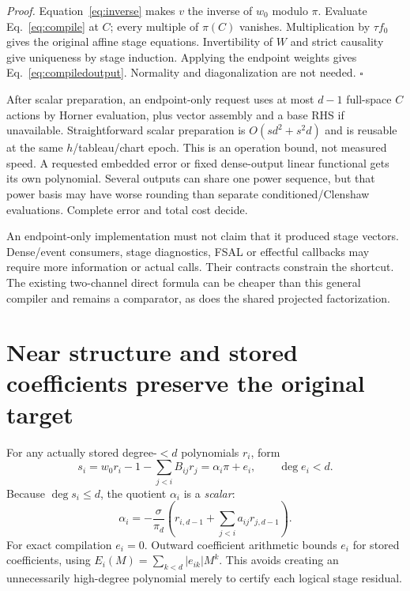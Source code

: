 \documentclass[aps,pra,reprint,onecolumn,10pt,notitlepage,nofootinbib]{revtex4-2}
\begin{document}
\emph{Proof.} Equation~\eqref{eq:inverse} makes $v$ the inverse of $w_0$
modulo $\pi$. Evaluate Eq.~\eqref{eq:compile} at $C$; every multiple of
$\pi(C)$ vanishes. Multiplication by $\tau f_0$ gives the original affine
stage equations. Invertibility of $W$ and strict causality give uniqueness by
stage induction. Applying the endpoint weights gives
Eq.~\eqref{eq:compiledoutput}. Normality and diagonalization are not needed.
\hfill$\square$

After scalar preparation, an endpoint-only request uses at most $d-1$
full-space $C$ actions by Horner evaluation, plus vector assembly and a base
RHS if unavailable. Straightforward scalar preparation is
$O(sd^2+s^2d)$ and is reusable at the same $h$/tableau/chart epoch. This is
an operation bound, not measured speed. A requested embedded error or fixed
dense-output linear functional gets its own polynomial. Several outputs can
share one power sequence, but that power basis may have worse rounding than
separate conditioned/Clenshaw evaluations. Complete error and total cost decide.

An endpoint-only implementation must not claim that it produced stage vectors.
Dense/event consumers, stage diagnostics, FSAL or effectful callbacks may require
more information or actual calls. Their contracts constrain the shortcut.
The existing two-channel direct formula can be cheaper than this general
compiler and remains a comparator, as does the shared projected factorization.

\section{Near structure and stored coefficients preserve the original target}

For any actually stored degree-$<d$ polynomials $r_i$, form
\begin{equation}
 s_i=w_0r_i-1-\sum_{j<i}B_{ij}r_j
     =\alpha_i\pi+e_i,\qquad\deg e_i<d.                     \label{eq:respoly}
\end{equation}
Because $\deg s_i\le d$, the quotient $\alpha_i$ is a \emph{scalar}:
\begin{equation}
 \alpha_i=-\frac{\sigma}{\pi_d}
     \left(r_{i,d-1}+\sum_{j<i}a_{ij}r_{j,d-1}\right).        \label{eq:alpha}
\end{equation}
For exact compilation $e_i=0$. Outward coefficient arithmetic bounds $e_i$
for stored coefficients, using $E_i(M)=\sum_{k<d}|e_{ik}|M^k$. This avoids
creating an unnecessarily high-degree polynomial merely to certify each
logical stage residual.
\end{document}

